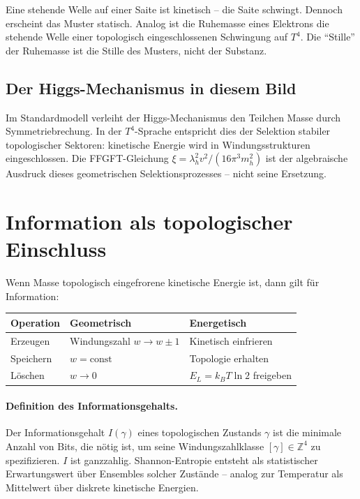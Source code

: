 Eine stehende Welle auf einer Saite ist kinetisch --
die Saite schwingt. Dennoch erscheint das Muster statisch.
Analog ist die Ruhemasse eines Elektrons die stehende
Welle einer topologisch eingeschlossenen Schwingung auf \(T^4\).
Die \enquote{Stille} der Ruhemasse ist die Stille des Musters,
nicht der Substanz.

\subsection{Der Higgs-Mechanismus in diesem Bild}

Im Standardmodell verleiht der Higgs-Mechanismus den Teilchen Masse
durch Symmetriebrechung. In der \(T^4\)-Sprache entspricht
dies der Selektion stabiler topologischer Sektoren: kinetische Energie
wird in Windungsstrukturen eingeschlossen.
Die FFGFT-Gleichung \(\xi = \lambda_h^2 v^2 / (16\pi^3 m_h^2)\)
ist der algebraische Ausdruck dieses geometrischen
Selektionsprozesses -- nicht seine Ersetzung.

\section{Information als topologischer Einschluss}

Wenn Masse topologisch eingefrorene kinetische Energie ist,
dann gilt für Information:

\begin{center}
\renewcommand{\arraystretch}{1.4}
\begin{tabular}{lll}
\toprule
\textbf{Operation} & \textbf{Geometrisch} & \textbf{Energetisch} \\
\midrule
Erzeugen  & Windungszahl \(w \to w\pm1\) & Kinetisch einfrieren \\
Speichern & \(w = \mathrm{const}\)       & Topologie erhalten \\
Löschen   & \(w \to 0\)                  & \(E_L = k_BT\ln2\) freigeben \\
\bottomrule
\end{tabular}
\end{center}

\paragraph{Definition des Informationsgehalts.}
Der Informationsgehalt \(I(\gamma)\) eines topologischen Zustands \(\gamma\)
ist die minimale Anzahl von Bits, die nötig ist,
um seine Windungszahlklasse \([\gamma] \in \mathbb{Z}^4\) zu spezifizieren.
\(I\) ist ganzzahlig.
Shannon-Entropie entsteht als statistischer Erwartungswert über
Ensembles solcher Zustände -- analog zur Temperatur als Mittelwert
über diskrete kinetische Energien.

